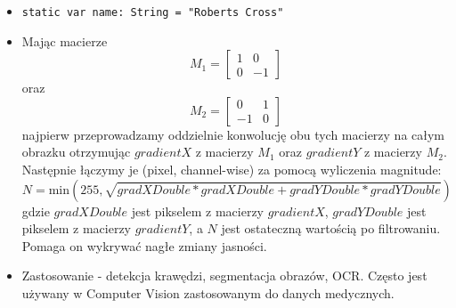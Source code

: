 \documentclass[a4paper]{article}
\begin{document}
\begin{itemize}
    \item \texttt{static var name: String = "Roberts Cross"}
    \item Mając macierze
          $$
              M_1 = \begin{bmatrix}
                  1 & 0  \\
                  0 & -1
              \end{bmatrix}
          $$
          oraz
          $$
              M_2 = \begin{bmatrix}
                  0  & 1 \\
                  -1 & 0
              \end{bmatrix}
          $$
          najpierw przeprowadzamy oddzielnie konwolucję obu tych macierzy na całym obrazku otrzymując $gradientX$ z macierzy $M_1$ oraz $gradientY$ z macierzy $M_2$. Następnie łączymy je (pixel, channel-wise) za pomocą wyliczenia magnitude:
          $$
              N = \text{min}(255, \sqrt{gradXDouble * gradXDouble + gradYDouble * gradYDouble})
          $$
          gdzie $gradXDouble$ jest pikselem z macierzy $gradientX$, $gradYDouble$ jest pikselem z macierzy $gradientY$, a $N$ jest ostateczną wartością po filtrowaniu. Pomaga on wykrywać nagłe zmiany jasności.
    \item Zastosowanie - detekcja krawędzi, segmentacja obrazów, OCR. Często jest używany w Computer Vision zastosowanym do danych medycznych.
\end{itemize}
\end{document}
